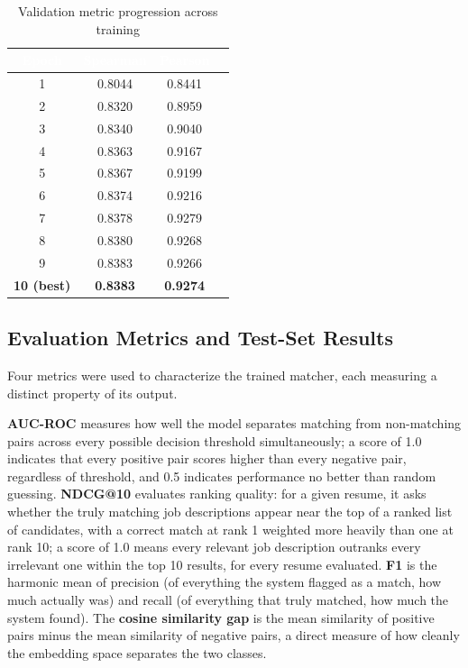 \documentclass[11pt,a4paper]{article}
\newcommand{\hdrow}{\rowcolor{TPnavy}}
\newcommand{\hdtxt}[1]{\textcolor{white}{\bfseries #1}}
\begin{document}
\begin{table}[H]
\centering
\caption{Validation metric progression across training}
\label{tab:mod1-curves}
\small
\begin{tabular}{cccc}
\toprule
\hdrow \hdtxt{Epoch} & \hdtxt{Spearman} & \hdtxt{Pearson} & \\
\midrule
1 & 0.8044 & 0.8441 & \\
\rowcolor{TPlight}
2 & 0.8320 & 0.8959 & \\
3 & 0.8340 & 0.9040 & \\
\rowcolor{TPlight}
4 & 0.8363 & 0.9167 & \\
5 & 0.8367 & 0.9199 & \\
\rowcolor{TPlight}
6 & 0.8374 & 0.9216 & \\
7 & 0.8378 & 0.9279 & \\
\rowcolor{TPlight}
8 & 0.8380 & 0.9268 & \\
9 & 0.8383 & 0.9266 & \\
\rowcolor{TPlight}
\textbf{10 (best)} & \textbf{0.8383} & \textbf{0.9274} & \\
\bottomrule
\end{tabular}
\end{table}

\subsection{Evaluation Metrics and Test-Set Results}
\label{sec:mod1-results}

Four metrics were used to characterize the trained matcher, each measuring a distinct property of its output.

\textbf{AUC-ROC} measures how well the model separates matching from non-matching pairs across every possible decision threshold simultaneously; a score of 1.0 indicates that every positive pair scores higher than every negative pair, regardless of threshold, and 0.5 indicates performance no better than random guessing. \textbf{NDCG@10} evaluates ranking quality: for a given resume, it asks whether the truly matching job descriptions appear near the top of a ranked list of candidates, with a correct match at rank 1 weighted more heavily than one at rank 10; a score of 1.0 means every relevant job description outranks every irrelevant one within the top 10 results, for every resume evaluated. \textbf{F1} is the harmonic mean of precision (of everything the system flagged as a match, how much actually was) and recall (of everything that truly matched, how much the system found). The \textbf{cosine similarity gap} is the mean similarity of positive pairs minus the mean similarity of negative pairs, a direct measure of how cleanly the embedding space separates the two classes.
\end{document}
